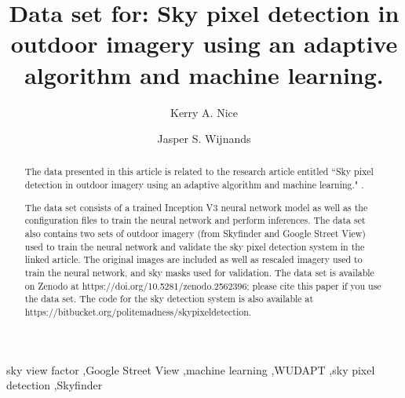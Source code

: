 \documentclass[final,3p,times,authoryear]{elsarticle}
\begin{document}
\begin{frontmatter}



\title{Data set for: Sky pixel detection in outdoor imagery using an adaptive algorithm and machine learning.} 

\author[melb]{Kerry A. Nice}
\author[melb]{Jasper S. Wijnands}
\address[melb]{Transport, Health and Urban Design, Melbourne School of Design, The University of Melbourne, Parkville VIC 3010, Australia}





\begin{abstract}

The data presented in this article is related to the research article entitled ``Sky pixel detection in outdoor imagery using an adaptive algorithm and machine learning." \citep{Nice2019UC}. 

The data set consists of a trained Inception V3 neural network model as well as the configuration files to train the neural network and perform inferences. The data set also contains two sets of outdoor imagery (from Skyfinder and Google Street View) used to train the neural network and validate the sky pixel detection system in the linked article. The original images are included as well as rescaled imagery used to train the neural network, and sky masks used for validation. The data set is available on Zenodo at https://doi.org/10.5281/zenodo.2562396; please cite this paper if you use the data set. The code for the sky detection system is also available at https://bitbucket.org/politemadness/skypixeldetection.


\end{abstract}

\begin{keyword}
sky view factor \sep Google Street View \sep machine learning \sep WUDAPT \sep sky pixel detection \sep Skyfinder
\end{keyword}

\end{frontmatter}
\end{document}
